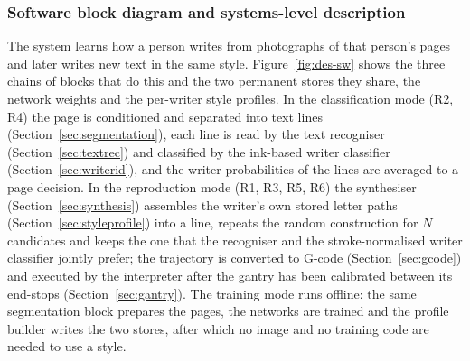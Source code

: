 \subsubsection{Software block diagram and systems-level description}

The system learns how a person writes from photographs of that person's pages and later writes new text in the same style.
Figure~\ref{fig:des-sw} shows the three chains of blocks that do this and the two permanent stores they share, the network weights and the per-writer style profiles.
In the classification mode (R2, R4) the page is conditioned and separated into text lines (Section~\ref{sec:segmentation}), each line is read by the text recogniser (Section~\ref{sec:textrec}) and classified by the ink-based writer classifier (Section~\ref{sec:writerid}), and the writer probabilities of the lines are averaged to a page decision.
In the reproduction mode (R1, R3, R5, R6) the synthesiser (Section~\ref{sec:synthesis}) assembles the writer's own stored letter paths (Section~\ref{sec:styleprofile}) into a line, repeats the random construction for $N$ candidates and keeps the one that the recogniser and the stroke-normalised writer classifier jointly prefer; the trajectory is converted to G-code (Section~\ref{sec:gcode}) and executed by the interpreter after the gantry has been calibrated between its end-stops (Section~\ref{sec:gantry}).
The training mode runs offline: the same segmentation block prepares the pages, the networks are trained and the profile builder writes the two stores, after which no image and no training code are needed to use a style.

